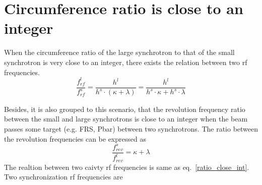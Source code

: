 \section{Circumference ratio is close to an integer}
\label{sec:close_to_int}
When the circumference ratio of the large synchrotron to that of the small synchrotron is very close to an integer, there exists the relation between two rf frequencies. 
\begin{equation} 
\label{ratio_close_int}
\frac{f_{\mathit{rf}}^{l}}{f_{\mathit{rf}}^{s}}=\frac{h^l}{h^s \cdot ( \kappa+ \lambda)}=\frac{h^l}{h^s \cdot  \kappa+ h^s \cdot \lambda}
\end{equation}




Besides, it is also grouped to this scenario, that the revolution frequency ratio between the small and large synchrotrons is close to an integer when the beam passes some target (e.g. FRS, Pbar) between two synchrotrons. The ratio between the revolution frequencies can be expressed as
\begin{equation} 
\frac{f_{\mathit{rev}}^{s}}{f_{\mathit{rev}}^{l}}=\kappa+ \lambda\label{close_to_interger1}
\end{equation}
The realtion between two caivty rf frequencies is same as eq.~\ref{ratio_close_int}. Two synchronization rf frequencies are

